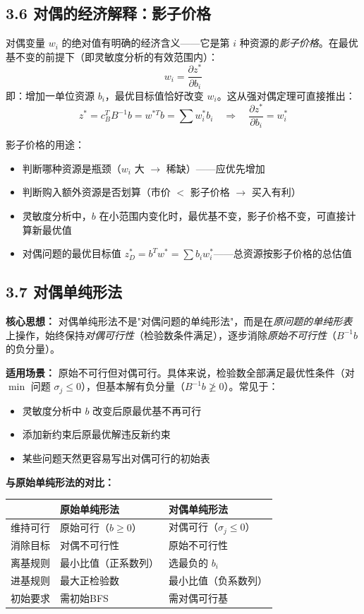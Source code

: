 \subsection{3.6 对偶的经济解释：影子价格}

对偶变量 $w_i$ 的绝对值有明确的经济含义——它是第 $i$ 种资源的\emph{影子价格}。在最优基不变的前提下（即灵敏度分析的有效范围内）：
\[
w_i = \frac{\partial z^*}{\partial b_i}
\]
即：增加一单位资源 $b_i$，最优目标值恰好改变 $w_i$。这从强对偶定理可直接推出：
\[
z^* = c_B^T B^{-1} b = w^{*T} b = \sum w_i^* b_i \quad\Rightarrow\quad \frac{\partial z^*}{\partial b_i} = w_i^*
\]

影子价格的用途：
\begin{itemize}
  \item 判断哪种资源是瓶颈（$w_i$ 大 $\to$ 稀缺）——应优先增加
  \item 判断购入额外资源是否划算（市价 $<$ 影子价格 $\to$ 买入有利）
  \item 灵敏度分析中，$b$ 在小范围内变化时，最优基不变，影子价格不变，可直接计算新最优值
  \item 对偶问题的最优目标值 $z_D^* = b^T w^* = \sum b_i w_i^*$——总资源按影子价格的总估值
\end{itemize}

\subsection{3.7 对偶单纯形法}

\textbf{核心思想：} 对偶单纯形法不是"对偶问题的单纯形法"，而是在\emph{原问题的单纯形表}上操作，始终保持\emph{对偶可行性}（检验数条件满足），逐步消除\emph{原始不可行性}（$B^{-1}b$ 的负分量）。

\textbf{适用场景：} 原始不可行但对偶可行。具体来说，检验数全部满足最优性条件（对 $\min$ 问题 $\sigma_j \le 0$），但基本解有负分量（$B^{-1}b \not\ge 0$）。常见于：
\begin{itemize}
  \item 灵敏度分析中 $b$ 改变后原最优基不再可行
  \item 添加新约束后原最优解违反新约束
  \item 某些问题天然更容易写出对偶可行的初始表
\end{itemize}

\textbf{与原始单纯形法的对比：}

\begin{tabular}{@{}p{1.8cm}p{2.6cm}p{2.6cm}@{}}
\toprule
& \textbf{原始单纯形法} & \textbf{对偶单纯形法} \\
\midrule
维持可行 & 原始可行（$b\ge0$） & 对偶可行（$\sigma_j\le0$） \\
消除目标 & 对偶不可行性 & 原始不可行性 \\
离基规则 & 最小比值（正系数列） & 选最负的 $b_i$ \\
进基规则 & 最大正检验数 & 最小比值（负系数列） \\
初始要求 & 需初始BFS & 需对偶可行基 \\
\bottomrule
\end{tabular}

